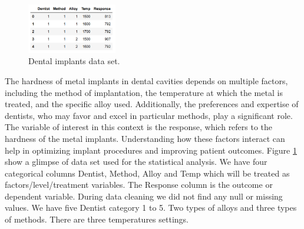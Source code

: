 \documentclass[12pt,a4paper]{style}
\begin{document}
	\begin{figure}
		\vspace{-1mm} %
		\includegraphics[width=0.35\textwidth]{dentist_dataset.png}
		\vspace{-4mm} %
		\caption{Dental implants data set.}
		\label{fig:dataset}
	\end{figure}
	The hardness of metal implants in dental cavities depends on multiple factors, including the method of implantation, the temperature at which the metal is treated, and the specific alloy used. Additionally, the preferences and expertise of dentists, who may favor and excel in particular methods, play a significant role. The variable of interest in this context is the response, which refers to the hardness of the metal implants. Understanding how these factors interact can help in optimizing implant procedures and improving patient outcomes.
	Figure \ref{fig:dataset} show a glimpse of data set used for the statistical analysis. We have four categorical columns Dentist, Method, Alloy and Temp which will be treated as factors/level/treatment variables. The Response column is the outcome or dependent variable. During data cleaning we did not find any null or missing values. We have five Dentist category 1 to 5. Two types of alloys and three types of methods. There are three temperatures settings. 
	
\end{document}
